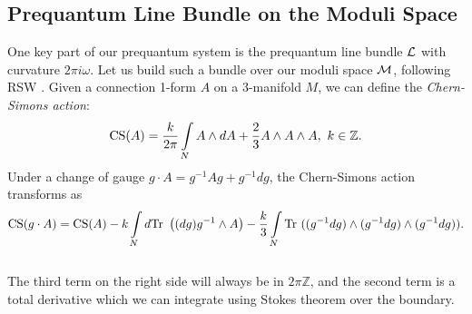 		
	\subsection{Prequantum Line Bundle on the Moduli Space}
	One key part of our prequantum system is the prequantum line bundle $\mathcal{L}$ with curvature $2\pi i \omega$. Let us build such a bundle over our moduli space $\mathcal{M}$, following RSW \cite{ramadas_comments_1989}. Given a connection 1-form $A$ on a 3-manifold $M$, we can define the \textit{Chern-Simons action}:
	\begin{equation}
	\text{CS}(A) = \frac{k}{2\pi}\int\limits_N A\wedge dA + \frac{2}{3}A\wedge A \wedge A,~ k\in\mathbb{Z}.
	\end{equation}
	Under a change of gauge $g\cdot A = g^{-1}Ag + g^{-1}dg$, the Chern-Simons action transforms as 
	\begin{equation}
	\text{CS}(g\cdot A) = \text{CS}(A) - k \int\limits_N d\text{Tr }\left((dg)g^{-1}\wedge A\right) - \frac{k}{3}\int\limits_N \text{Tr }((g^{-1}dg)\wedge (g^{-1}dg)\wedge (g^{-1}dg)).
	\label{e:cs-gauge}
	\end{equation}\\
	The third term on the right side will always be in $2\pi \mathbb{Z}$, and the second term is a total derivative which we can integrate using Stokes theorem over the boundary.
	
